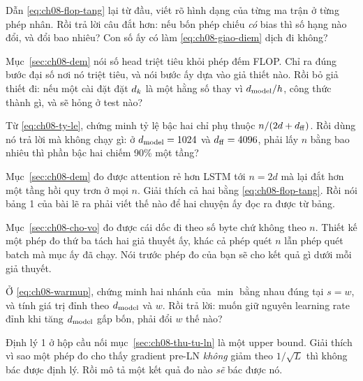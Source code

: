 \exercises

\tierunderstand

\begin{bt}
  \item Dẫn \eqref{eq:ch08-flop-tang} lại từ đầu, viết rõ hình dạng của từng ma
    trận ở từng phép nhân. Rồi trả lời câu đắt hơn: nếu bốn phép chiếu
    \emph{có} bias thì số hạng nào đổi, và đổi bao nhiêu? Con số ấy có làm
    \eqref{eq:ch08-giao-diem} dịch đi không?

  \item Mục~\ref{sec:ch08-dem} nói số head triệt tiêu khỏi phép đếm FLOP. Chỉ ra
    đúng bước đại số nơi nó triệt tiêu, và nói bước ấy dựa vào giả thiết nào.
    Rồi bỏ giả thiết đi: nếu một cài đặt đặt \(d_{k}\) là một hằng số thay vì
    \(d_{\mathrm{model}}/h\), công thức thành gì, và  sẽ hỏng ở
    test nào?

  \item Từ \eqref{eq:ch08-ty-le}, chứng minh tỷ lệ bậc hai chỉ phụ thuộc
    \(n/(2d + d_{\mathrm{ff}})\). Rồi dùng nó trả lời mà không chạy gì: ở
    \(d_{\mathrm{model}} = 1024\) và \(d_{\mathrm{ff}} = 4096\), phải lấy \(n\) bằng bao nhiêu thì
    phần bậc hai chiếm 90\% một tầng?

  \item Mục~\ref{sec:ch08-dem} đo được attention rẻ hơn LSTM tới \(n = 2d\) mà
    lại đắt hơn một tầng hồi quy trơn ở mọi \(n\). Giải thích cả hai bằng
    \eqref{eq:ch08-flop-tang}. Rồi nói bảng 1 của bài lẽ ra phải viết thế nào
    để hai chuyện ấy đọc ra được từ bảng.

  \item Mục~\ref{sec:ch08-cho-vo} đo được cái dốc đi theo số byte chứ không theo
    \(n\). Thiết kế một phép đo thứ ba tách hai giả thuyết ấy, khác cả phép quét
    \(n\) lẫn phép quét batch mà mục ấy đã chạy. Nói trước phép đo của bạn sẽ
    cho kết quả gì dưới mỗi giả thuyết.

  \item Ở \eqref{eq:ch08-warmup}, chứng minh hai nhánh của \(\min\) bằng nhau
    đúng tại \(s = w\), và tính giá trị đỉnh theo \(d_{\mathrm{model}}\) và \(w\). Rồi trả
    lời: muốn giữ nguyên learning rate đỉnh khi tăng \(d_{\mathrm{model}}\) gấp bốn, phải
    đổi \(w\) thế nào?

  \item Định lý 1 ở hộp cầu nối mục~\ref{sec:ch08-thu-tu-ln} là một upper bound.
    Giải thích vì sao một phép đo cho thấy gradient pre-LN \emph{không} giảm
    theo \(1/\sqrt{L}\) thì không bác được định lý. Rồi mô tả một kết quả đo
    nào \emph{sẽ} bác được nó.


\end{bt}
